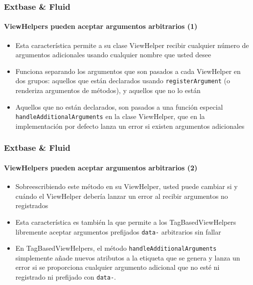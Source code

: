 \begin{frame}[fragile]
	\frametitle{Extbase \& Fluid}
	\framesubtitle{ViewHelpers pueden aceptar argumentos arbitrarios (1)}

	\begin{itemize}

		\item Esta característica permite a su clase ViewHelper recibir cualquier número de
			argumentos adicionales usando cualquier nombre que usted desee

		\item Funciona separando los argumentos que son pasados a cada ViewHelper
			en dos grupos: aquellos que están declarados usando \texttt{registerArgument}
			(o renderiza argumentos de métodos), y aquellos que no lo están

		\item Aquellos que no están declarados, son pasados a una función especial
			\texttt{handleAdditionalArguments}
			en la clase ViewHelper, que en la implementación por defecto lanza un
			error si existen argumentos adicionales

	\end{itemize}

\end{frame}


\begin{frame}[fragile]
	\frametitle{Extbase \& Fluid}
	\framesubtitle{ViewHelpers pueden aceptar argumentos arbitrarios (2)}

	\begin{itemize}

		\item Sobreescribiendo este método en su ViewHelper, usted puede cambiar si y
			cuándo el ViewHelper debería lanzar un error al recibir argumentos
			no registrados

		\item Esta característica es también la que permite a los TagBasedViewHelpers libremente
			aceptar argumentos prefijados \texttt{data-} arbitrarios sin fallar

		\item En TagBasedViewHelpers, el método \texttt{handleAdditionalArguments}
			simplemente añade nuevos atributos a la etiqueta que se genera y lanza un
			error si se proporciona cualquier argumento adicional que no esté ni registrado ni
			prefijado con \texttt{data-}.

	\end{itemize}

\end{frame}

